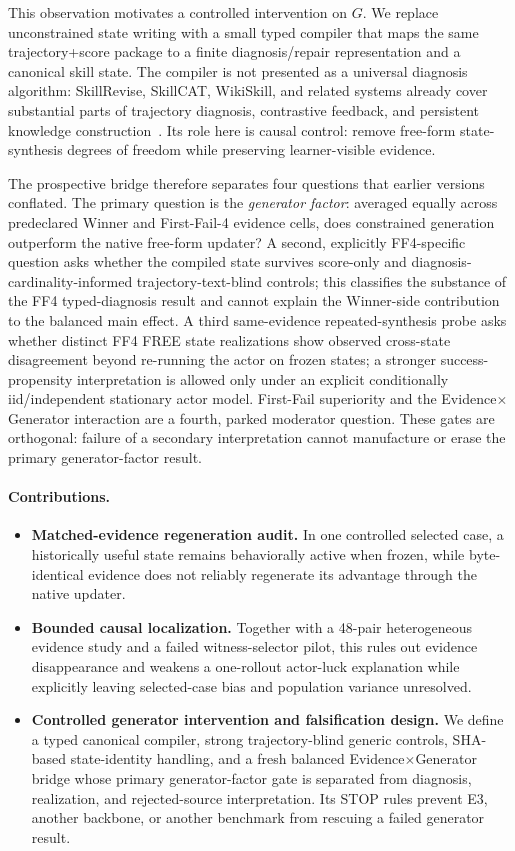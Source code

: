 This observation motivates a controlled intervention on $G$. We replace unconstrained state writing with a small typed compiler that maps the same trajectory+score package to a finite diagnosis/repair representation and a canonical skill state. The compiler is not presented as a universal diagnosis algorithm: SkillRevise, SkillCAT, WikiSkill, and related systems already cover substantial parts of trajectory diagnosis, contrastive feedback, and persistent knowledge construction~\citep{liu2026skillrevise,chen2026skillcat,tang2026wikiskill}. Its role here is causal control: remove free-form state-synthesis degrees of freedom while preserving learner-visible evidence.

The prospective bridge therefore separates four questions that earlier versions conflated. The primary question is the \emph{generator factor}: averaged equally across predeclared Winner and First-Fail-4 evidence cells, does constrained generation outperform the native free-form updater? A second, explicitly FF4-specific question asks whether the compiled state survives score-only and diagnosis-cardinality-informed trajectory-text-blind controls; this classifies the substance of the FF4 typed-diagnosis result and cannot explain the Winner-side contribution to the balanced main effect. A third same-evidence repeated-synthesis probe asks whether distinct FF4 FREE state realizations show observed cross-state disagreement beyond re-running the actor on frozen states; a stronger success-propensity interpretation is allowed only under an explicit conditionally iid/independent stationary actor model. First-Fail superiority and the Evidence$\times$Generator interaction are a fourth, parked moderator question. These gates are orthogonal: failure of a secondary interpretation cannot manufacture or erase the primary generator-factor result.

\paragraph{Contributions.}
\begin{itemize}
    \item \textbf{Matched-evidence regeneration audit.} In one controlled selected case, a historically useful state remains behaviorally active when frozen, while byte-identical evidence does not reliably regenerate its advantage through the native updater.
    \item \textbf{Bounded causal localization.} Together with a 48-pair heterogeneous evidence study and a failed witness-selector pilot, this rules out evidence disappearance and weakens a one-rollout actor-luck explanation while explicitly leaving selected-case bias and population variance unresolved.
    \item \textbf{Controlled generator intervention and falsification design.} We define a typed canonical compiler, strong trajectory-blind generic controls, SHA-based state-identity handling, and a fresh balanced Evidence$\times$Generator bridge whose primary generator-factor gate is separated from diagnosis, realization, and rejected-source interpretation. Its STOP rules prevent E3, another backbone, or another benchmark from rescuing a failed generator result.
\end{itemize}

